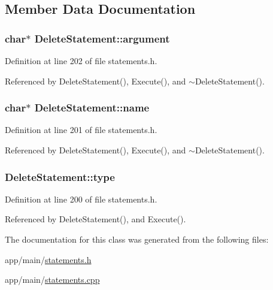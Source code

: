 \subsection{Member Data Documentation}
\subsubsection[{\texorpdfstring{argument}{argument}}]{\setlength{\rightskip}{0pt plus 5cm}char$\ast$ Delete\+Statement\+::argument\hspace{0.3cm}{\ttfamily [private]}}\hypertarget{classDeleteStatement_a0fe7f24dcfd05e0f7f449e19aaabee2d}{}\label{classDeleteStatement_a0fe7f24dcfd05e0f7f449e19aaabee2d}


Definition at line 202 of file statements.\+h.



Referenced by Delete\+Statement(), Execute(), and $\sim$\+Delete\+Statement().

\subsubsection[{\texorpdfstring{name}{name}}]{\setlength{\rightskip}{0pt plus 5cm}char$\ast$ Delete\+Statement\+::name\hspace{0.3cm}{\ttfamily [private]}}\hypertarget{classDeleteStatement_aec9706bae02a354afec8f639e283e5b9}{}\label{classDeleteStatement_aec9706bae02a354afec8f639e283e5b9}


Definition at line 201 of file statements.\+h.



Referenced by Delete\+Statement(), Execute(), and $\sim$\+Delete\+Statement().

\subsubsection[{\texorpdfstring{type}{type}}]{ Delete\+Statement\+::type\hspace{0.3cm}{\ttfamily [private]}}\hypertarget{classDeleteStatement_a46629e67cd652c61ccabfc79c4cc8e01}{}\label{classDeleteStatement_a46629e67cd652c61ccabfc79c4cc8e01}


Definition at line 200 of file statements.\+h.



Referenced by Delete\+Statement(), and Execute().



The documentation for this class was generated from the following files\+:\begin{DoxyCompactItemize}
\item 
app/main/\hyperlink{statements_8h}{statements.\+h}\item 
app/main/\hyperlink{statements_8cpp}{statements.\+cpp}\end{DoxyCompactItemize}
